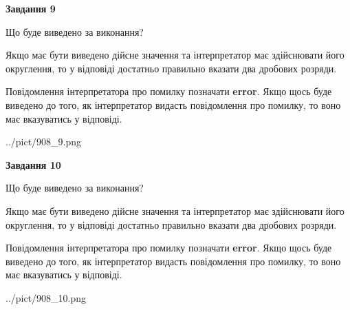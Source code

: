 \documentclass[12pt, ukrainian]{article}
\begin{document}
{\begin {Large}
{\begin {center}\textbf{Завдання 9}\end {center}}\par
Що буде виведено за виконання? \par

Якщо має бути виведено дійсне значення та інтерпретатор має здійснювати його округлення, 
то у відповіді достатньо правильно вказати два дробових розряди.

Повідомлення інтерпретатора про помилку позначати \textbf{error}.
Якщо щось буде виведено до того, як інтерпретатор видасть повідомлення про помилку, 
то воно має вказуватись у відповіді. \par

\begin{center}
	{../pict/908_9.png}
\end{center}
\newpage

{\begin {center}\textbf{Завдання 10}\end {center}}\par
Що буде виведено за виконання? \par

Якщо має бути виведено дійсне значення та інтерпретатор має здійснювати його округлення, 
то у відповіді достатньо правильно вказати два дробових розряди.

Повідомлення інтерпретатора про помилку позначати \textbf{error}.
Якщо щось буде виведено до того, як інтерпретатор видасть повідомлення про помилку, 
то воно має вказуватись у відповіді. \par

\begin{center}
	{../pict/908_10.png}
\end{center}
\newpage

\end {Large}}
\end{document}

